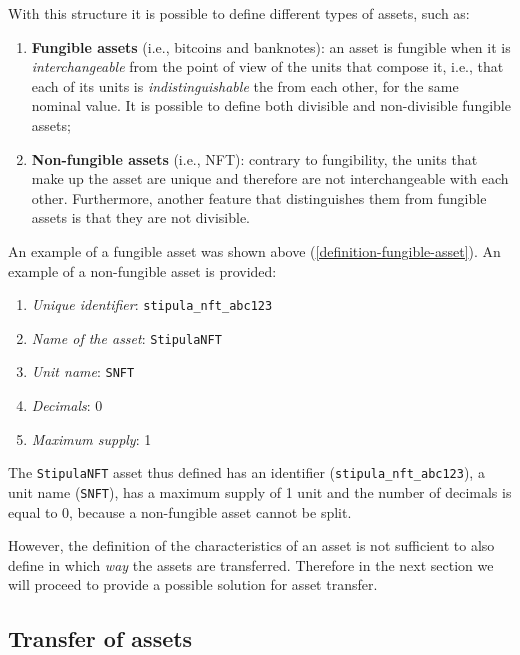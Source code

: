 With this structure it is possible to define different types of assets, such as:
\begin{enumerate}
	\item \textbf{Fungible assets} (i.e., bitcoins and banknotes): an asset is fungible when it is 
	\textit{interchangeable} from the point of view of the units that compose it, i.e., that each of its units 
	is \textit{indistinguishable} the from each other, for the same nominal value. It is possible to define 
	both divisible and non-divisible fungible assets;
	\item \textbf{Non-fungible assets} (i.e., NFT): contrary to fungibility, the units that make up the asset 
	are unique and therefore are not interchangeable with each other. Furthermore, another feature that 
	distinguishes them from fungible assets is that they are not divisible.
\end{enumerate}

An example of a fungible asset was shown above (\ref{definition-fungible-asset}). An example of a 
non-fungible asset is provided:
\begin{enumerate}
	\item \textit{Unique identifier}: \verb|stipula_nft_abc123|
	\item \textit{Name of the asset}: \verb|StipulaNFT|
	\item \textit{Unit name}: \verb|SNFT|
	\item \textit{Decimals}: 0
	\item \textit{Maximum supply}: 1
\end{enumerate}
The \verb|StipulaNFT| asset thus defined has an identifier (\verb|stipula_nft_abc123|), a unit name 
(\verb|SNFT|), has a maximum supply of 1 unit and the number of decimals is equal to 0, because a 
non-fungible asset cannot be split.

However, the definition of the characteristics of an asset is not sufficient to also define in which 
\textit{way} the assets are transferred. Therefore in the next section we will proceed to provide a 
possible solution for asset transfer.

\subsection{Transfer of assets}

